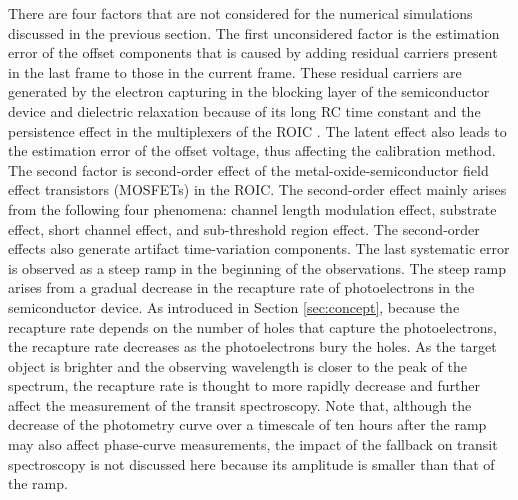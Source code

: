\documentclass{aastex62}
\begin{document}
There are four factors that are not considered for the numerical simulations discussed in the previous section. The first unconsidered factor is the estimation error of the offset components that is caused by adding residual carriers present in the last frame to those in the current frame. These residual carriers are generated by the electron capturing in the blocking layer of the semiconductor device and dielectric relaxation because of its long RC time constant \citep{2015PASP..127..665R} and the persistence effect in the multiplexers of the ROIC \citep{2014PASP..126.1134B}. The latent effect also leads to the estimation error of the offset voltage, thus affecting the calibration method. The second factor is second-order effect of the metal-oxide-semiconductor field effect transistors (MOSFETs) in the ROIC. The second-order effect mainly arises from the following four phenomena: channel length modulation effect, substrate effect, short channel effect, and sub-threshold region effect. The second-order effects also generate artifact time-variation components. The last systematic error is observed as a steep ramp in the beginning of the observations. The steep ramp arises from a gradual decrease in the recapture rate of photoelectrons in the semiconductor device. As introduced in Section \ref{sec:concept}, because the recapture rate depends on the number of holes that capture the photoelectrons, the recapture rate decreases as the photoelectrons bury the holes. As the target object is brighter and the observing wavelength is closer to the peak of the spectrum, the recapture rate is thought to more rapidly decrease and further affect the measurement of the transit spectroscopy. Note that, although the decrease of the photometry curve over a timescale of ten hours after the ramp may also affect phase-curve measurements, the impact of the fallback on transit spectroscopy is not discussed here because its amplitude is smaller than that of the ramp.
\end{document}
